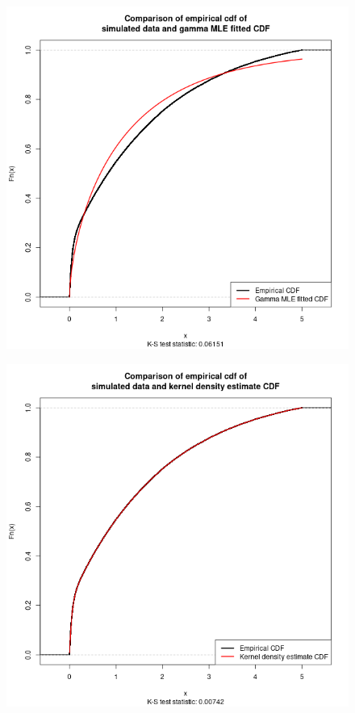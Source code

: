 \documentclass[english]{paper}
\begin{document}
\begin{figure}
\caption{}

\includegraphics[scale=0.75]{images/Comparison-of-CDF-gamma}
\end{figure}

\begin{figure}
\caption{}

\includegraphics[scale=0.75]{images/Comparison-of-CDF-kernel-density}
\end{figure}
\end{document}
